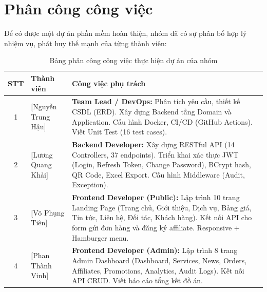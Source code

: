 \section{Phân công công việc}
Để có được một dự án phần mềm hoàn thiện, nhóm đã có sự phân bổ hợp lý nhiệm vụ, phát huy thế mạnh của từng thành viên:

\begin{table}[htbp]
    \centering
    \begin{tabular}{|c|p{3.5cm}|p{8.5cm}|}
        \hline
        \textbf{STT} & \textbf{Thành viên} & \textbf{Công việc phụ trách} \\
        \hline
        1 & [Nguyễn Trung Hậu] & \textbf{Team Lead / DevOps:} Phân tích yêu cầu, thiết kế CSDL (ERD). Xây dựng Backend tầng Domain và Application. Cấu hình Docker, CI/CD (GitHub Actions). Viết Unit Test (16 test cases). \\
        \hline
        2 & [Lương Quang Khải] & \textbf{Backend Developer:} Xây dựng RESTful API (14 Controllers, 37 endpoints). Triển khai xác thực JWT (Login, Refresh Token, Change Password), BCrypt hash, QR Code, Excel Export. Cấu hình Middleware (Audit, Exception). \\
        \hline
        3 & [Võ Phụng Tiên] & \textbf{Frontend Developer (Public):} Lập trình 10 trang Landing Page (Trang chủ, Giới thiệu, Dịch vụ, Bảng giá, Tin tức, Liên hệ, Đối tác, Khách hàng). Kết nối API cho form gửi đơn hàng và đăng ký affiliate. Responsive + Hamburger menu. \\
        \hline
        4 & [Phan Thành Vinh] & \textbf{Frontend Developer (Admin):} Lập trình 8 trang Admin Dashboard (Dashboard, Services, News, Orders, Affiliates, Promotions, Analytics, Audit Logs). Kết nối API CRUD. Viết báo cáo tổng kết đồ án. \\
        \hline
    \end{tabular}
    \caption{Bảng phân công công việc thực hiện dự án của nhóm}
    \label{tab:phan_cong}
\end{table}


